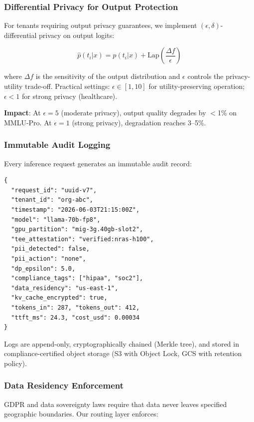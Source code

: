 \documentclass[conference,10pt]{IEEEtran}
\begin{document}
\subsubsection{Differential Privacy for Output Protection}

For tenants requiring output privacy guarantees, we implement $(\epsilon, \delta)$-differential privacy on output logits:

\begin{equation}
\hat{p}(t_i | x) = p(t_i | x) + \text{Lap}\left(\frac{\Delta f}{\epsilon}\right)
\end{equation}

\noindent where $\Delta f$ is the sensitivity of the output distribution and $\epsilon$ controls the privacy-utility trade-off. Practical settings: $\epsilon \in [1, 10]$ for utility-preserving operation; $\epsilon < 1$ for strong privacy (healthcare).

\textbf{Impact}: At $\epsilon = 5$ (moderate privacy), output quality degrades by $<$1\% on MMLU-Pro. At $\epsilon = 1$ (strong privacy), degradation reaches 3--5\%.

\subsubsection{Immutable Audit Logging}

Every inference request generates an immutable audit record:

\begin{lstlisting}
{
  "request_id": "uuid-v7",
  "tenant_id": "org-abc",
  "timestamp": "2026-06-03T21:15:00Z",
  "model": "llama-70b-fp8",
  "gpu_partition": "mig-3g.40gb-slot2",
  "tee_attestation": "verified:nras-h100",
  "pii_detected": false,
  "pii_action": "none",
  "dp_epsilon": 5.0,
  "compliance_tags": ["hipaa", "soc2"],
  "data_residency": "us-east-1",
  "kv_cache_encrypted": true,
  "tokens_in": 287, "tokens_out": 412,
  "ttft_ms": 24.3, "cost_usd": 0.00034
}
\end{lstlisting}

Logs are append-only, cryptographically chained (Merkle tree), and stored in compliance-certified object storage (S3 with Object Lock, GCS with retention policy).

\subsubsection{Data Residency Enforcement}

GDPR and data sovereignty laws require that data never leaves specified geographic boundaries. Our routing layer enforces:
\end{document}

